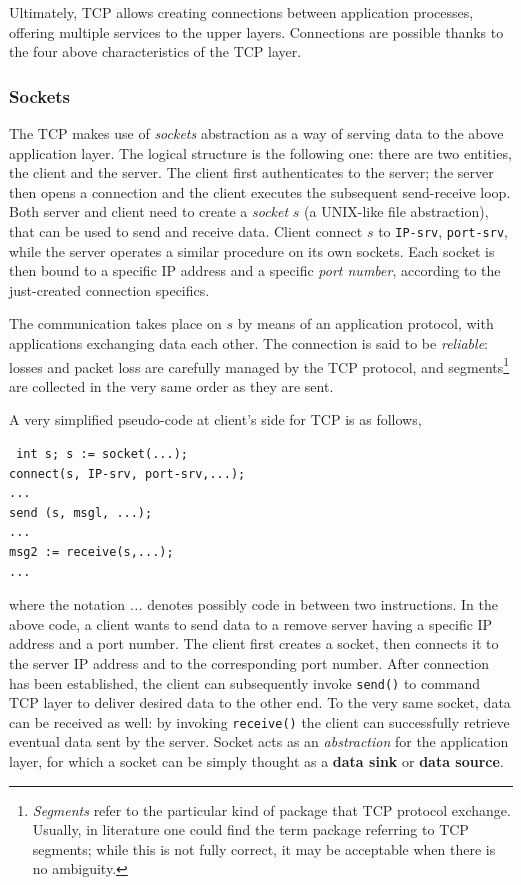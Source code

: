 \documentclass[10pt]{extreport}
\begin{document}
Ultimately, TCP allows creating connections between application processes,
offering multiple services to the upper layers. Connections are possible thanks
to the four above characteristics of the TCP layer.

\subsubsection{Sockets}

The TCP makes use of \emph{sockets} abstraction as a way of serving data to the
above application layer. The logical structure is the following one: there are
two entities, the client and the server. The client first authenticates to the
server; the server then opens a connection and the client executes the
subsequent send-receive loop. Both server and client need to create a
\emph{socket} $s$ (a UNIX-like file abstraction), that can be used to send and
receive data. Client connect $s$ to \texttt{IP-srv}, \texttt{port-srv}, while
the server operates a similar procedure on its own sockets. Each socket is then
bound to a specific IP address and a specific \emph{port number}, according to
the just-created connection specifics.

The communication takes place on $s$ by means of an application protocol, with
applications exchanging data each other. The connection is said to be
\emph{reliable}: losses and packet loss are carefully managed by the TCP
protocol, and segments\footnote{\emph{Segments} refer to the particular kind of
package that TCP protocol exchange. Usually, in literature one could find the
term package referring to TCP segments; while this is not fully correct, it may
be acceptable when there is no ambiguity.} are collected in the very same order
as they are sent.

A very simplified pseudo-code at client's side for TCP is as follows,

\begin{verbatim} int s; s := socket(...); 
connect(s, IP-srv, port-srv,...); 
...
send (s, msgl, ...); 
... 
msg2 := receive(s,...); 
... 
\end{verbatim}

where the notation \emph{...} denotes possibly code in between two
instructions. In the above code, a client wants to send data to a remove server
having a specific IP address and a port number. The client first creates a
socket, then connects it to the server IP address and to the corresponding port
number. After connection has been established, the client can subsequently
invoke \texttt{send()} to command TCP layer to deliver desired data to the
other end. To the very same socket, data can be received as well: by invoking
\texttt{receive()} the client can successfully retrieve eventual data sent by
the server. Socket acts as an \emph{abstraction} for the application layer, for
which a socket can be simply thought as a \textbf{data sink} or \textbf{data
source}.
\end{document}
